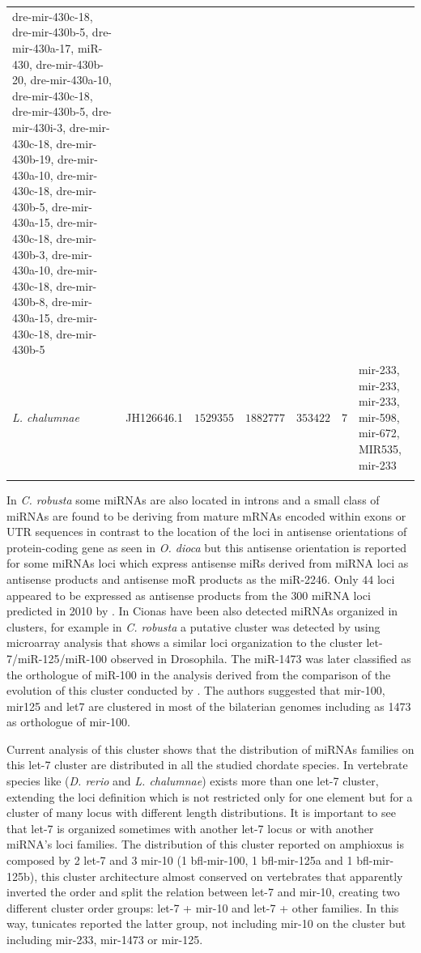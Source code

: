 \documentclass[graybox]{svmult}
\begin{document}
\begin{small}
\begin{center}
\begin{longtable}{p{2.0 cm}p{2 cm}p{2 cm}p{2 cm}p{1.2 cm}p{1.0 cm}p{2.6 cm}}
{dre-mir-430c-18, dre-mir-430b-5, dre-mir-430a-17, miR-430, dre-mir-430b-20, 
dre-mir-430a-10, dre-mir-430c-18, dre-mir-430b-5, dre-mir-430i-3, 
dre-mir-430c-18, dre-mir-430b-19, dre-mir-430a-10, dre-mir-430c-18, 
dre-mir-430b-5, dre-mir-430a-15, dre-mir-430c-18, dre-mir-430b-3, 
dre-mir-430a-10, dre-mir-430c-18, dre-mir-430b-8, dre-mir-430a-15, 
dre-mir-430c-18, dre-mir-430b-5} \\
\textit{L. chalumnae} & JH126646.1 & $1529355$ & $1882777$ & $353422$ & $7$ & 
mir-233, mir-233, mir-233, mir-598, mir-672, MIR535, mir-233 \\
\hline\noalign{\smallskip}
\end{longtable}
\end{center}
\end{small}

In \textit{C. robusta} some miRNAs are also located in introns and a small 
class of miRNAs are found to be deriving from mature mRNAs encoded within exons 
or UTR sequences \cite{Hendrix2010} in contrast to the location of the  loci in 
antisense orientations of protein-coding gene as seen in \textit{O. dioca} but 
this antisense orientation is reported for some miRNAs loci which express 
antisense miRs derived from miRNA loci as antisense products and antisense moR 
products as the miR-2246. Only $44$ loci appeared to be expressed as antisense 
products from the $300$ miRNA loci predicted in 2010 by \cite{Hendrix2010}. In 
Cionas have been also detected miRNAs organized in clusters, for example in  
\textit{C. robusta} a putative cluster was detected by \cite{Keshavan2010} 
using microarray analysis that shows a similar loci organization to the cluster 
let-7/miR-125/miR-100 observed in Drosophila. The miR-1473 was later classified 
as the orthologue of miR-100 in the analysis derived from the comparison of the 
evolution of this cluster conducted by \cite{Griffiths-Jones2011}. The authors 
suggested that mir-100, mir125 and let7 are clustered in most of the bilaterian 
genomes including as 1473 as orthologue of mir-100. 

Current analysis of this cluster shows that the distribution of miRNAs families 
on this let-7 cluster are distributed in all the studied chordate species. In 
vertebrate species like (\textit{D. rerio} and \textit{L. chalumnae}) exists 
more than one let-7 cluster, extending the loci definition which is not 
restricted only for one element but for a cluster of many locus with different 
length distributions. It is important to see that let-7 is organized sometimes 
with another let-7 locus or with another miRNA's loci families. The 
distribution 
of this cluster reported on amphioxus is composed by 2 let-7 and 3 mir-10 (1 
bfl-mir-100, 1 bfl-mir-125a and 1 bfl-mir-125b), this 
cluster architecture almost conserved on vertebrates that apparently inverted 
the order and split the relation between let-7 and mir-10, creating two 
different cluster order groups: let-7 + mir-10 and let-7 + other families. 
In this way, tunicates reported the latter group, not including mir-10 on the 
cluster but including mir-233, mir-1473 or mir-125. 
\end{document}
